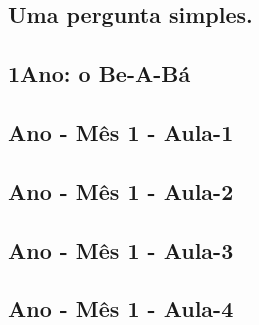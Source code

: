 \section{\sffamily Uma pergunta simples.}







\color{black}
\begin{multicols}{2}
\chapter[ 1\textordmasculine\space Ano: o Be-A-Bá]{1\textordmasculine\space Ano: o Be-A-Bá}

\pagebreak

%
%
%
%
%
%
%
%

\pagebreak

	\section[\sffamily 1\textordmasculine\space Ano - Mês 1 - Aula-1]{\textordmasculine\space Ano - Mês 1 - Aula-1}


\section[\sffamily 1\textordmasculine\space Ano - Mês 1 - Aula-2]{\textordmasculine\space Ano - Mês 1 - Aula-2}


\section[\sffamily 1\textordmasculine\space Ano - Mês 1 - Aula-3]{\textordmasculine\space Ano - Mês 1 - Aula-3}


\section[\sffamily 1\textordmasculine\space Ano - Mês 1 - Aula-4]{\textordmasculine\space Ano - Mês 1 - Aula-4}



\end{multicols}
